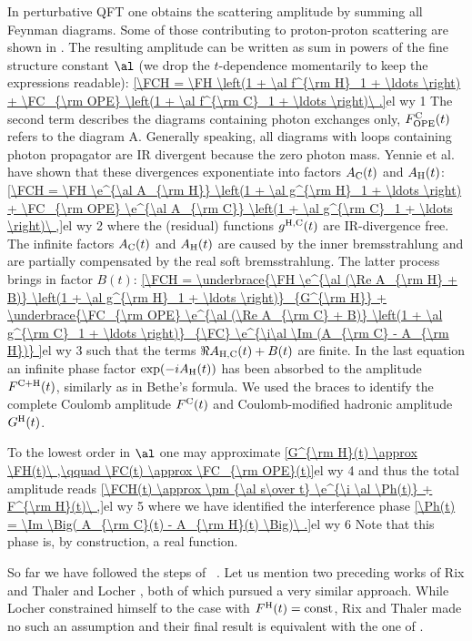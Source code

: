 In perturbative QFT one obtains the scattering amplitude by summing all Feynman diagrams. Some of those contributing to proton-proton scattering are shown in . The resulting amplitude can be written as sum in powers of the fine structure constant $\al$ (we drop the $t$-dependence momentarily to keep the expressions readable):
\eqref{\FCH = \FH \left(1 + \al f^{\rm H}_1 + \ldots \right) + \FC_{\rm OPE} \left(1 + \al f^{\rm C}_1 + \ldots \right)\ .}{el wy 1}
The second term describes the diagrams containing photon exchanges only, $F^{\rm C}_{\rm OPE}(t)$ refers to the diagram  A. Generally speaking, all diagrams with loops containing photon propagator are IR divergent because the zero photon mass. Yennie et al.  have shown that these divergences exponentiate into factors $A_{\rm C}(t)$ and $A_{\rm H}(t)$:
\eqref{\FCH = \FH \e^{\al A_{\rm H}} \left(1 + \al g^{\rm H}_1 + \ldots \right) + \FC_{\rm OPE} \e^{\al A_{\rm C}} \left(1 + \al g^{\rm C}_1 + \ldots \right)\ ,}{el wy 2}
where the (residual) functions $g^{\rm H, C}(t)$ are IR-divergence free. The infinite factors $A_{\rm C}(t)$ and $A_{\rm H}(t)$ are caused by the inner bremsstrahlung and are partially compensated by the real soft bremsstrahlung. The latter process brings in factor $B(t)$:
\eqref{\FCH =
\underbrace{\FH \e^{\al (\Re A_{\rm H} + B)} \left(1 + \al g^{\rm H}_1 + \ldots \right)}_{G^{\rm H}}
+
\underbrace{\FC_{\rm OPE} \e^{\al (\Re A_{\rm C} + B)} \left(1 + \al g^{\rm C}_1 + \ldots \right)}_{\FC}
\e^{\i\al \Im (A_{\rm C} - A_{\rm H})}
}{el wy 3}
such that the terms $\Re A_{\rm H, C}(t) + B(t)$ are finite. In the last equation an infinite phase factor $\exp(-iA_{\rm H}(t))$ has been absorbed to the amplitude $F^{\rm C+H}(t)$, similarly as in Bethe's formula. We used the braces to identify the complete Coulomb amplitude $F^{\rm C}(t)$ and Coulomb-modified hadronic amplitude $G^{\rm H}(t)$.

To the lowest order in $\al$ one may approximate
\eqref{G^{\rm H}(t) \approx \FH(t)\ ,\qquad \FC(t) \approx \FC_{\rm OPE}(t)}{el wy 4}
and thus the total amplitude reads
\eqref{\FCH(t) \approx \pm {\al s\over t} \e^{\i \al \Ph(t)} + F^{\rm H}(t)\ ,}{el wy 5}
where we have identified the interference phase
\eqref{\Ph(t) = \Im \Big( A_{\rm C}(t) - A_{\rm H}(t) \Big)\ .}{el wy 6}
Note that this phase is, by construction, a real function.

So far we have followed the steps of \WaY\ . Let us mention two preceding works of Rix and Thaler  and Locher , both of which pursued a very similar approach. While Locher constrained himself to the case with $F^{\rm H}(t) = \hbox{const}$, Rix and Thaler made no such an assumption and their final result is equivalent with the one of \WY.

